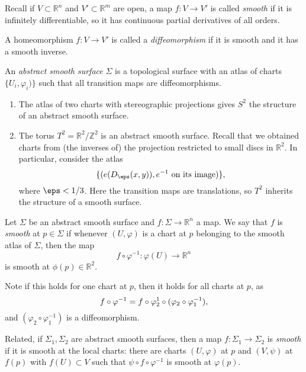\documentclass[12pt]{article}
\begin{document}
Recall if $V \subset \mathbb{R}^{n}$ and $V' \subset \mathbb{R}^{m}$ are open, a map $f : V \to V'$ is called \emph{smooth} if it is infinitely differentiable, so it has continuous partial derivatives of all orders.

A homeomorphism $f : V \to V'$ is called a \emph{diffeomorphism} if it is smooth and it has a smooth inverse.

\begin{definition}
	An \emph{abstract smooth surface} $\Sigma$ is a topological surface with an atlas of charts $\{U_i, \varphi_i)\}$ such that all transition maps are diffeomorphisms.
\end{definition}

\begin{exbox}
	\begin{enumerate}[1.]
		\item The atlas of two charts with stereographic projections gives $S^2$ the structure of an abstract smooth surface.
		\item The torus $T^2 = \mathbb{R}^2 / \mathbb{Z}^2$ is an abstract smooth surface. Recall that we obtained charts from (the inverses of) the projection restricted to small discs in $\mathbb{R}^2$. In particular, consider the atlas
			\[
				\{(e(D_{\eps}(x,y)), e^{-1} \text{ on its image})\}
			,\]
			where $\eps < 1/3$. Here the transition maps are translations, so $T^2$ inherits the structure of a smooth surface.
	\end{enumerate}
\end{exbox}

\begin{definition}
	Let $\Sigma$ be an abstract smooth surface and $f : \Sigma \to \mathbb{R}^{n}$ a map. We say that $f$ is \emph{smooth} at $p \in \Sigma$ if whenever $(U, \varphi)$ is a chart at $p$ belonging to the smooth atlas of $\Sigma$, then the map
	\[
	f \circ \varphi^{-1} : \varphi(U) \to \mathbb{R}^{n}
	\]
	is smooth at $\phi(p) \in \mathbb{R}^2$.
\end{definition}

Note if this holds for one chart at $p$, then it holds for all charts at $p$, as
\[
f \circ \varphi^{-1} = f \circ \varphi_2^{\-1} \circ (\varphi_2 \circ \varphi_1^{-1})
,\]
and $(\varphi_2 \circ \varphi_1^{-1})$ is a diffeomorphism.

Related, if $\Sigma_1, \Sigma_2$ are abstract smooth surfaces, then a map $f : \Sigma_1 \to \Sigma_2$ is \emph{smooth} if it is smooth at the local charts: there are charts $(U, \varphi)$ at $p$ and $(V, \psi)$ at $f(p)$ with $f(U) \subset V$ such that $\psi \circ f \circ \varphi^{-1}$ is smooth at $\varphi(p)$.
\end{document}
